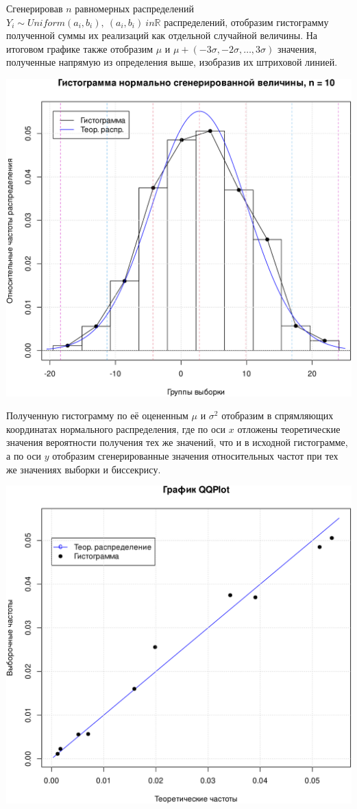 \documentclass[
]{article}
\begin{document}
Сгенерировав \(n\) равномерных распределений
\(Y_i \sim Uniform(a_i, b_i), \ (a_i, b_i) \ in \mathbb{R}\)
распределений, отобразим гистограмму полученной суммы их реализаций как
отдельной случайной величины. На итоговом графике также отобразим
\(\mu\) и \(\mu + (-3\sigma, -2\sigma, \dots, 3\sigma)\) значения,
полученные напрямую из определения выше, изобразив их штриховой линией.

\begin{center}\includegraphics[width=0.6\linewidth]{Prac4_files/figure-latex/unnamed-chunk-3-1} \end{center}

Полученную гистограмму по её оцененным \(\mu\) и \(\sigma^2\) отобразим
в спрямляющих координатах нормального распределения, где по оси \(x\)
отложены теоретические значения вероятности получения тех же значений,
что и в исходной гистограмме, а по оси \(y\) отобразим сгенерированные
значения относительных частот при тех же значениях выборки и биссекрису.

\begin{center}\includegraphics[width=0.6\linewidth]{Prac4_files/figure-latex/unnamed-chunk-4-1} \end{center}
\end{document}
